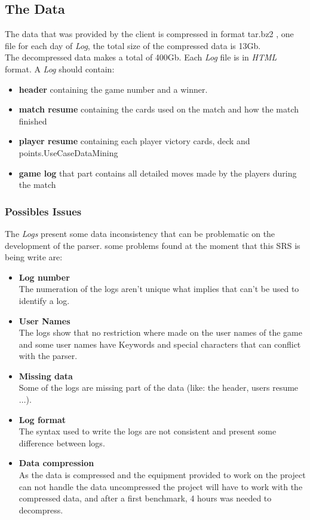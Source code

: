 \documentclass{scrreprt}
\begin{document}
\subsection{The Data}
The data that was provided by the client is compressed in format tar.bz2 , one file for each day of \textit{Log}, the total size of the compressed data is
13Gb.\\
The decompressed data makes a total of 400Gb.
Each \textit{Log} file is in \textit{HTML} format.
A \textit{Log} should contain:
\begin{itemize}
  \item{\textbf{header}} containing the game number and a winner.
  \item{\textbf{match resume}} containing the cards used on the match and how the match
    finished
  \item{\textbf{player resume}} containing each player victory cards, deck and points.UseCaseDataMining
  \item{\textbf{game log}} that part contains all detailed moves made by the players
    during the match
\end{itemize}

\subsubsection{Possibles Issues}
The \textit{Logs} present some data inconsistency that can be problematic on the
development of the parser.
some problems found at the moment that this SRS is being write are:
\begin{itemize}
  \item \textbf{Log number}\\
    The numeration of the logs aren't unique what implies that can't be used to
    identify a log.
  \item \textbf{User Names}\\
    The logs show that no restriction where made on the user names of the game
    and some user names have Keywords and special characters that can conflict
    with the parser.
   \item \textbf{Missing data}\\
     Some of the logs are missing part of the data (like: the header, users
     resume $\ldots$).
   \item \textbf{Log format}\\
     The syntax used to write the logs are not consistent and present some
     difference between logs.
    \item \textbf{Data compression}\\
      As the data is compressed and the equipment provided to work on the
      project can not handle the data uncompressed the project will have to work
      with the compressed data, and after a first benchmark, 4 hours was needed
      to decompress.
\end{itemize}
\end{document}
